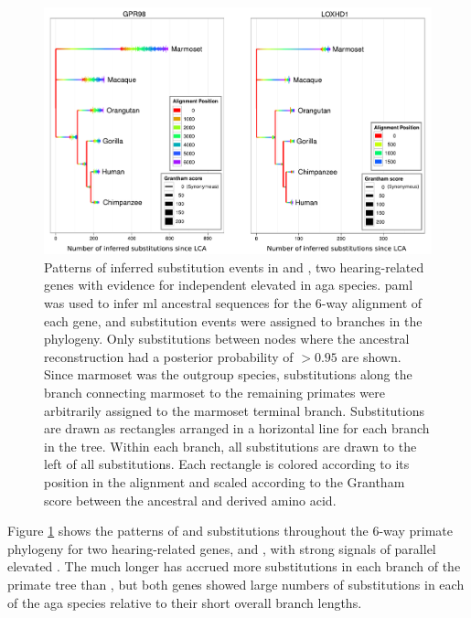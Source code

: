 \begin{figure}
\centering
\includegraphics[scale=0.6]{Figs/gorilla_gpr98.pdf}
\caption{Patterns of inferred substitution events in  and
  , two hearing-related genes with evidence for independent
  elevated \dnds in \ac{aga} species. \ac{paml} was used to infer
  \ac{ml} ancestral sequences \citep{Yang1995} for the 6-way alignment
  of each gene, and substitution events were assigned to branches in
  the phylogeny. Only substitutions between nodes where the ancestral
  reconstruction had a posterior probability of $>0.95$ are
  shown. Since marmoset was the outgroup species, substitutions along
  the branch connecting marmoset to the remaining primates were
  arbitrarily assigned to the marmoset terminal branch. Substitutions
  are drawn as rectangles arranged in a horizontal line for each
  branch in the tree. Within each branch, all \syn substitutions are
  drawn to the left of all \nsyn substitutions. Each rectangle is
  colored according to its position in the alignment and scaled
  according to the Grantham score \citep{Grantham1974} between the
  ancestral and derived amino acid.}
\label{fig_gorilla_gpr98}
\end{figure}

Figure \ref{fig_gorilla_gpr98} shows the patterns of \nsyn and \syn
substitutions throughout the 6-way primate phylogeny for two
hearing-related genes,  and , with strong
signals of parallel elevated \dnds. The much longer  has
accrued more substitutions in each branch of the primate tree than
, but both genes showed large numbers of \nsyn
substitutions in each of the \ac{aga} species relative to their short
overall branch lengths.

